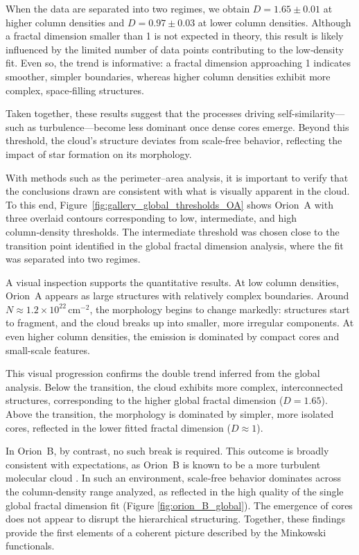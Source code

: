 When the data are separated into two regimes, we obtain \(D = 1.65 \pm 0.01\) at higher column densities and \(D = 0.97 \pm 0.03\) at lower column densities.  
Although a fractal dimension smaller than 1 is not expected in theory, this result is likely influenced by the limited number of data points contributing to the low‑density fit.  
Even so, the trend is informative: a fractal dimension approaching 1 indicates smoother, simpler boundaries, whereas higher column densities exhibit more complex, space‑filling structures.

Taken together, these results suggest that the processes driving self-similarity—such as turbulence—become less dominant once dense cores emerge.  
Beyond this threshold, the cloud’s structure deviates from scale-free behavior, reflecting the impact of star formation on its morphology.

With methods such as the perimeter–area analysis, it is important to verify that the conclusions drawn are consistent with what is visually apparent in the cloud.  
To this end, Figure~\ref{fig:gallery_global_thresholds_OA} shows Orion~A with three overlaid contours corresponding to low, intermediate, and high column‑density thresholds.  
The intermediate threshold was chosen close to the transition point identified in the global fractal dimension analysis, where the fit was separated into two regimes.

A visual inspection supports the quantitative results.  
At low column densities, Orion~A appears as large structures with relatively complex boundaries.  
Around \(N \approx 1.2 \times 10^{22}\,\mathrm{cm}^{-2}\), the morphology begins to change markedly: structures start to fragment, and the cloud breaks up into smaller, more irregular components.  
At even higher column densities, the emission is dominated by compact cores and small-scale features.

This visual progression confirms the double trend inferred from the global analysis.  
Below the transition, the cloud exhibits more complex, interconnected structures, corresponding to the higher global fractal dimension (\(D = 1.65\)).  
Above the transition, the morphology is dominated by simpler, more isolated cores, reflected in the lower fitted fractal dimension (\(D \approx 1\)).  

In Orion~B, by contrast, no such break is required.  
This outcome is broadly consistent with expectations, as Orion~B is known to be a more turbulent molecular cloud \cite{orkisz2017turbulence}.  
In such an environment, scale‑free behavior dominates across the column‑density range analyzed, as reflected in the high quality of the single global fractal dimension fit (Figure \ref{fig:orion_B_global}).  
The emergence of cores does not appear to disrupt the hierarchical structuring.  
Together, these findings provide the first elements of a coherent picture described by the Minkowski functionals.

